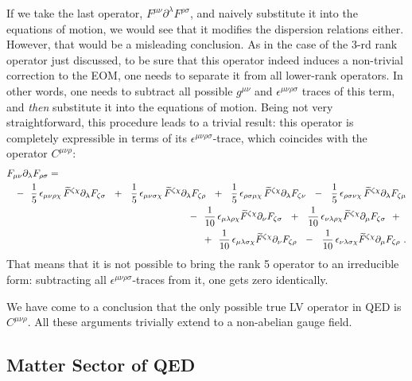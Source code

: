 \documentclass[12pt]{revtex4}
\newcommand{\p}{\partial}
\newcommand{\wt}{\widetilde}
\begin{document}
	If we take the last operator, 
$ F^{\mu\nu} \partial^\lambda F^{\rho\sigma} $,
	and naively substitute it into the equations of motion, 
	we would see that it modifies the dispersion relations either.
	However, that would be a misleading conclusion.
	As in the case of the 3-rd rank operator just discussed,
	to be sure that this operator indeed induces a non-trivial 
	correction to the EOM, one needs to separate it from all
	lower-rank operators.
	In other words, one needs to subtract all possible 
	$ g^{\mu\nu} $ and $ \epsilon^{\mu\nu\rho\sigma} $ 
	traces of this term, and {\it then} substitute it into the
	equations of motion.
	Being not very straightforward, this procedure leads to a 
	trivial result: this operator is completely expressible
	in terms of its $ \epsilon^{\mu\nu\rho\sigma} $-trace, which
	coincides with the operator $ C^{\mu\nu\rho} $:
\begin{eqnarray*}
\lefteqn{
	F_{\mu\nu} \p_\lambda F_{\rho\sigma} = 
	} &&
	\\
	&&
	-~~ 
	\frac{1}{5}\,\epsilon_{\mu\nu\rho\chi} \,
	\wt{F}^{\zeta\chi}\p_\lambda F_{\zeta\sigma} 
 	~~+~~
	\frac{1}{5}\,\epsilon_{\mu\nu\sigma\chi} \,
	\wt{F}^{\zeta\chi}\p_\lambda F_{\zeta\rho} 
	~~+~~
	\frac{1}{5}\,\epsilon_{\rho\sigma\mu\chi} \,
	\wt{F}^{\zeta\chi}\p_\lambda F_{\zeta\nu} 
 	~~-~~
	\frac{1}{5}\,\epsilon_{\rho\sigma\nu\chi} \,
	\wt{F}^{\zeta\chi}\p_\lambda F_{\zeta\mu}
	\\
	&&
	-~~
	\frac{1}{10}\,\epsilon_{\mu\lambda\rho\chi} 
	\wt{F}^{\zeta\chi}\p_\nu F_{\zeta\sigma} 
	~~+~~
	\frac{1}{10}\,\epsilon_{\nu\lambda\rho\chi} 
	\wt{F}^{\zeta\chi}\p_\mu F_{\zeta\sigma} 
	~~+~~
	\\
	&&
	+~~
	\frac{1}{10}\,\epsilon_{\mu\lambda\sigma\chi} 
	\wt{F}^{\zeta\chi}\p_\nu F_{\zeta\rho} 
	~~-~~
	\frac{1}{10}\,\epsilon_{\nu\lambda\sigma\chi} 
	\wt{F}^{\zeta\chi}\p_\mu F_{\zeta\rho}
	~.
\end{eqnarray*}
	That means that it is not possible to bring the rank 5 operator
	to an irreducible form: subtracting all
	$ \epsilon^{\mu\nu\rho\sigma} $-traces from it, one gets
	zero identically. 

	We have come to a conclusion that the only possible true
	LV operator in QED is $ C^{\mu\nu\rho} $.  
	All these arguments trivially extend to a non-abelian gauge
	field.

\subsection{Matter Sector of QED}
\end{document}
